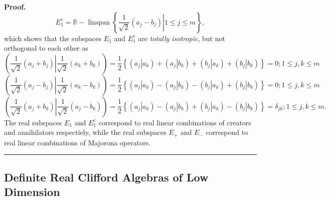 \documentclass[aps,preprint]{revtex4}%
\newenvironment{proof}[1][Proof]{\noindent\textbf{#1.} }{\ \rule{0.5em}{0.5em}}
\begin{document}
\begin{proof}
\begin{equation}
E_{1}^{c}=\mathbb{R-}\operatorname*{linspan}\left\{  \left.  \frac{1}{\sqrt
{2}}\left(  a_{j}-b_{j}\right)  \right\vert 1\leq j\leq m\right\}  ,
\end{equation}
which shows that the subspaces $E_{1}$ and $E_{1}^{c}$ are \emph{totally
isotropic}, but not orthogonal to each other as
\begin{equation}
\left(  \left.  \frac{1}{\sqrt{2}}\left(  a_{j}+b_{j}\right)  \right\vert
\frac{1}{\sqrt{2}}\left(  a_{k}+b_{k}\right)  \right)  =\frac{1}{2}\left\{
\left(  \left.  a_{j}\right\vert a_{k}\right)  +\left(  \left.  a_{j}%
\right\vert b_{k}\right)  +\left(  \left.  b_{j}\right\vert a_{k}\right)
+\left(  \left.  b_{j}\right\vert b_{k}\right)  \right\}  =0;1\leq j,k\leq m
\end{equation}%
\begin{equation}
\left(  \left.  \frac{1}{\sqrt{2}}\left(  a_{j}-b_{j}\right)  \right\vert
\frac{1}{\sqrt{2}}\left(  a_{k}-b_{k}\right)  \right)  =\frac{1}{2}\left\{
\left(  \left.  a_{j}\right\vert a_{k}\right)  -\left(  \left.  a_{j}%
\right\vert b_{k}\right)  -\left(  \left.  b_{j}\right\vert a_{k}\right)
+\left(  \left.  b_{j}\right\vert b_{k}\right)  \right\}  =0;1\leq j,k\leq m
\end{equation}%
\begin{equation}
\left(  \left.  \frac{1}{\sqrt{2}}\left(  a_{j}+b_{k}\right)  \right\vert
\frac{1}{\sqrt{2}}\left(  a_{j}-b_{k}\right)  \right)  =\frac{1}{2}\left\{
\left(  \left.  a_{j}\right\vert a_{k}\right)  -\left(  \left.  a_{j}%
\right\vert b_{k}\right)  +\left(  \left.  b_{j}\right\vert a_{k}\right)
-\left(  \left.  b_{j}\right\vert b_{k}\right)  \right\}  =\delta_{jk};1\leq
j,k\leq m.
\end{equation}
The real subspaces $E_{1}$ and $E_{1}^{c}$ correspond to real linear
combinations of creators and annihilators respectiely, while the real
subspaces $E_{+}$ and $E_{-}$ correspond to real linear combinations of
Majorona operators.
\end{proof}

\subsection{Definite Real Clifford Algebras of Low Dimension}
\end{document}
